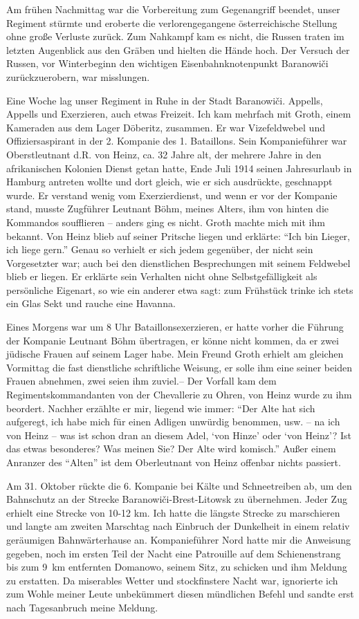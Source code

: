 Am frühen Nachmittag war die Vorbereitung zum Gegenangriff beendet, unser Regiment stürmte und eroberte die verlorengegangene österreichische Stellung ohne große Verluste zurück. Zum Nahkampf kam es nicht, die Russen traten im letzten Augenblick aus den Gräben und hielten die Hände hoch. Der Versuch der Russen, vor Winterbeginn den wichtigen Eisen\-bahn\-knoten\-punkt Baranowiči zurückzuerobern, war misslungen.

Eine Woche lag unser Regiment in Ruhe in der Stadt Baranowiči. Appells, Appells und Exerzieren, auch etwas Freizeit. Ich kam mehrfach mit Groth, einem Kameraden aus dem Lager Döberitz, zusammen. Er war Vizefeldwebel und Offiziersaspirant in der 2. Kompanie des 1. Bataillons. Sein Kompanieführer war Oberstleutnant d.R. von Heinz, ca. 32 Jahre alt, der mehrere Jahre in den afrikanischen Kolonien Dienst getan hatte, Ende Juli 1914 seinen Jahresurlaub in Hamburg antreten wollte und dort gleich, wie er sich ausdrückte, geschnappt wurde. Er verstand wenig vom Exerzierdienst, und wenn er vor der Kompanie stand, musste Zugführer Leutnant Böhm, meines Alters, ihm von hinten die Kommandos soufflieren -- anders ging es nicht. Groth machte mich mit ihm bekannt. Von Heinz blieb auf seiner Pritsche liegen und erklärte: \enquote{Ich bin Lieger, ich liege gern.} Genau so verhielt er sich jedem gegenüber, der nicht sein Vorgesetzter war; auch bei den dienstlichen Besprechungen mit seinem Feldwebel blieb er liegen. Er erklärte sein Verhalten nicht ohne Selbstgefälligkeit als persönliche Eigenart, so wie ein anderer etwa sagt: zum Frühstück trinke ich stets ein Glas Sekt und rauche eine Havanna.

Eines Morgens war um 8 Uhr Bataillonsexerzieren, er hatte vorher die Führung der Kompanie Leutnant Böhm übertragen, er könne nicht kommen, da er zwei jüdische Frauen auf seinem Lager habe. Mein Freund Groth erhielt am gleichen Vormittag die fast dienstliche schriftliche Weisung, er solle ihm eine seiner beiden Frauen abnehmen, zwei seien ihm zuviel.-- Der Vorfall kam dem Regimentskommandanten von der Chevallerie zu Ohren, von Heinz wurde zu ihm beordert. Nachher erzählte er mir, liegend wie immer: \enquote{Der Alte hat sich aufgeregt, ich habe mich für einen Adligen unwürdig benommen, usw. -- na ich von Heinz -- was ist schon dran an diesem Adel, \enquote{von Hinze} oder \enquote{von Heinz}? Ist das etwas besonderes? Was meinen Sie? Der Alte wird komisch.} Außer einem Anranzer des \enquote{Alten} ist dem Oberleutnant von Heinz offenbar nichts passiert.

Am 31. Oktober rückte die 6. Kompanie bei Kälte und Schneetreiben ab, um den Bahnschutz an der Strecke Baranowiči-Brest-Litowsk zu übernehmen. Jeder Zug erhielt eine Strecke von 10-12 km. Ich hatte die längste Strecke zu marschieren und langte am zweiten Marschtag nach Einbruch der Dunkelheit in einem relativ geräumigen Bahnwärterhause an. Kompanieführer Nord hatte mir die Anweisung gegeben, noch im ersten Teil der Nacht eine Patrouille auf dem Schienenstrang bis zum 9~km entfernten Domanowo, seinem Sitz, zu schicken und ihm Meldung zu erstatten. Da miserables Wetter und stockfinstere Nacht war, ignorierte ich zum Wohle meiner Leute unbekümmert diesen mündlichen Befehl und sandte erst nach Tagesanbruch meine Meldung.


